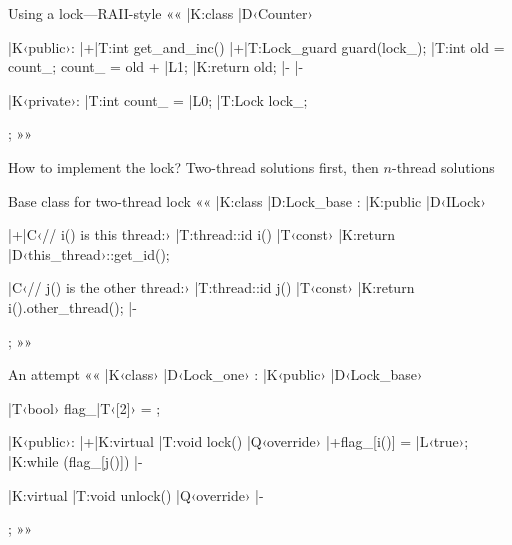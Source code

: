\documentclass{beamer}
\begin{document}
\begin{frame}[fragile]{Using a lock—RAII-style}{}
  ««
  |K:class |D‹Counter›
  {
  |K‹public›:
  	|+|T:int get_and_inc()
    {
    	|+|T:Lock_guard guard(lock_);
      |T:int old = count_;
      count_ = old + |L1;
      |K:return old; |-
    } |-

  |K‹private›:
  	|T:int count_ = |L0;
  	|T:Lock lock_;
  };
  »»
\end{frame}

\begin{frame}{How to implement the lock?}{}
  Two-thread solutions first, then $n$-thread solutions
\end{frame}

\begin{frame}[fragile]{Base class for two-thread lock}{}
  ««
  |K:class |D:Lock_base : |K:public |D‹ILock›
  {
  	|+|C‹// i() is this thread:›
    |T:thread::id i() |T‹const›
    {
    	|K:return |D‹this_thread›::get_id();
    }

    |C‹// j() is the other thread:›
    |T:thread::id j() |T‹const›
    {
    	|K:return i().other_thread();
    } |-
  };
  »»
\end{frame}

\begin{frame}[fragile]{An attempt}{}
  ««
  |K‹class› |D‹Lock_one› : |K‹public› |D‹Lock_base›
  {
  	|T‹bool› flag_|T‹[2]› = {};

  |K‹public›:
  	|+|K:virtual |T:void lock() |Q‹override›
    {
    	|+flag_[i()] = |L‹true›;
      |K:while (flag_[j()]) {} |-
    }

    |K:virtual |T:void unlock() |Q‹override› {} |-
  };
  »»
\end{frame}
\end{document}
